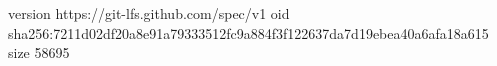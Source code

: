 version https://git-lfs.github.com/spec/v1
oid sha256:7211d02df20a8e91a79333512fc9a884f3f122637da7d19ebea40a6afa18a615
size 58695
